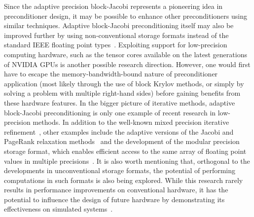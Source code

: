 Since the adaptive precision block-Jacobi represents a pioneering idea in
preconditioner design, it may be possible to enhance other preconditioners using
similar techniques. Adaptive block-Jacobi preconditioning itself may also be
improved further by using non-conventional storage formats instead of the
standard IEEE floating point types~\cite{adaptive-jacobi-gpu}. Exploiting
support for low-precision computing hardware, such as the tensor cores available
on the latest generations of NVIDIA GPUs is another possible research direction.
However, one would first have to escape the memory-bandwidth-bound nature of
preconditioner application (most likely through the use of block Krylov methods,
or simply by solving a problem with multiple right-hand sides) before gaining
benefits from these hardware features. In the bigger
picture of iterative methods, adaptive block-Jacobi preconditioning is only one
example of recent research in low-precision methods. In addition to the
well-known mixed precision iterative refinement~\cite{higham-ir}, other examples
include the adaptive versions of the Jacobi and PageRank relaxation
methods~\cite{jacobi,jacobi-modular,pagerank} and the development of the modular
precision storage format, which enables efficient access to the same array of
floating point values in multiple
precisions~\cite{jacobi-modular,pagerank,anzt-ir}. It is also worth mentioning
that, orthogonal to the developments in unconventional storage formats, the
potential of performing computations in such formats is also being explored.
While this research rarely results in performance improvements on conventional
hardware, it has the potential to influence the design of future hardware by
demonstrating its effectiveness on simulated systems~\cite{floatx, flexfloat}.

